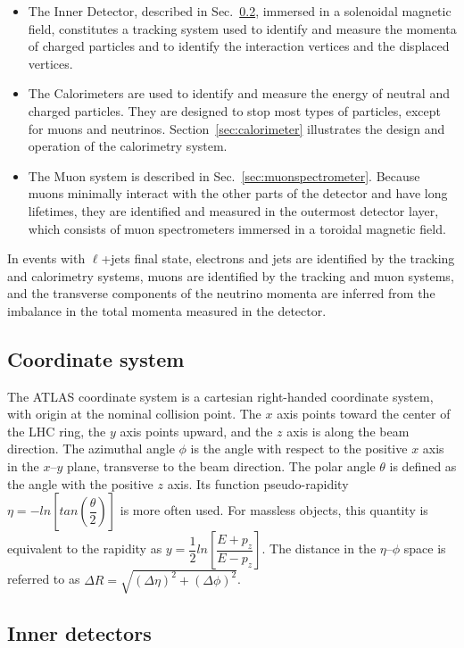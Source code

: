 \begin{itemize}
\item The Inner Detector, described in Sec.~\ref{sec:ID}, immersed in
  a solenoidal magnetic field, constitutes a tracking system used to
  identify and measure the momenta of charged particles and to
  identify the interaction vertices and the displaced vertices. 
\item The Calorimeters are used to identify and measure the energy of
  neutral and charged particles. They are designed to stop most types
  of particles, except for muons and
  neutrinos. Section~\ref{sec:calorimeter} illustrates the design and
  operation of the calorimetry system. 
\item The Muon system is described in
  Sec.~\ref{sec:muonspectrometer}. Because muons minimally interact
  with the other parts of the detector and have long lifetimes, they
  are identified and measured in the outermost detector layer, which
  consists of muon spectrometers immersed in a toroidal magnetic
  field. 
\end{itemize}

In \ttbar{} events with $\ell{}$+jets final state, electrons and jets
are identified by the tracking and calorimetry systems, muons are
identified by the tracking and muon systems, and the transverse
components of the neutrino momenta are inferred from the imbalance in
the total momenta measured in the detector.

\subsection{Coordinate system}
\label{sec:coords}

The ATLAS coordinate system is a cartesian right-handed coordinate
system, with origin at the nominal collision point. The $x$ axis
points toward the center of the LHC ring, the $y$ axis points upward,
and the $z$ axis is along the beam direction. The azimuthal angle
$\phi$ is the angle with respect to the positive $x$ axis in the
$x$--$y$ plane, transverse to the beam direction. The polar angle
$\theta$ is defined as the angle with the positive $z$ axis. Its
function pseudo-rapidity $\eta = -ln[tan(\dfrac{\theta}{2})]$ is more often
used. For massless objects, this quantity is equivalent to the
rapidity as $y = \dfrac{1}{2}ln[\dfrac{E+p_z}{E-p_z}]$. The distance in
the $\eta$--$\phi$ space is referred to as $\Delta R = \sqrt{(\Delta
  \eta)^2+(\Delta \phi)^2}$.

\subsection{Inner detectors}
\label{sec:ID}

